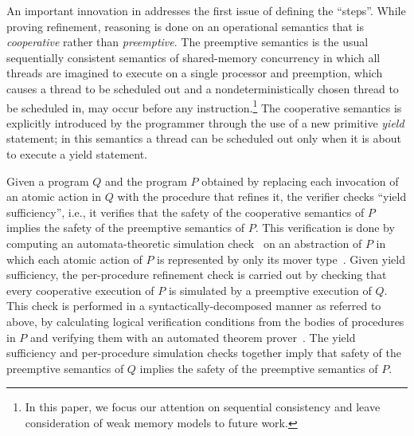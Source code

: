 An important innovation in \civl addresses the first issue of defining the ``steps''. While proving refinement,
reasoning is done on an operational semantics that is {\em cooperative\/} rather than {\em preemptive\/}.
The preemptive semantics is the usual sequentially consistent semantics of shared-memory concurrency in which all threads are imagined
to execute on a single processor and preemption, which causes a thread to be scheduled out and a nondeterministically chosen thread to 
be scheduled in, may occur before any instruction.\footnote{In this paper, 
we focus our attention on sequential consistency and leave consideration of weak memory models to future work.}
The cooperative semantics is explicitly introduced by the programmer through the use of a new primitive {\em yield\/} statement;
in this semantics a thread can be scheduled out only when it is about to execute a yield statement.

Given a program $Q$ and the program $P$ obtained by replacing each invocation of an atomic action in $Q$ 
with the procedure that refines it, the \civl verifier checks ``yield sufficiency'', i.e., it verifies that the safety of the cooperative semantics of $P$ implies the safety of the preemptive semantics of $P$.
This verification is done by computing an automata-theoretic simulation check~\cite{HenzingerHK95} 
on an abstraction of $P$ in which each atomic action of $P$ is represented by only its mover type~\cite{Lipton75,FlanaganFLQ08}. 
Given yield sufficiency, the per-procedure refinement check is carried out by checking that every cooperative execution of $P$ is simulated by a preemptive execution of $Q$.
This check is performed in a syntactically-decomposed manner as referred to above, by calculating logical verification conditions from the bodies of procedures in $P$ and 
verifying them with an automated theorem prover~\cite{MouraB08}.
The yield sufficiency and per-procedure simulation checks together imply that safety of the preemptive semantics of $Q$ implies the safety of the preemptive semantics of $P$.


